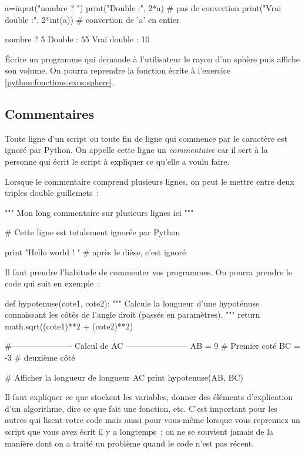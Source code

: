 {\begin{remarque}
\begin{pythonexemple}
a=input("nombre ? ")
print("Double :", 2*a)                # pas de convertion
print("Vrai double :", 2*int(a))      # convertion de 'a' en entier
\end{pythonexemple}

\begin{result}
nombre ? 5
Double : 55
Vrai double : 10
\end{result}
\end{remarque}

\begin{exercice}
Écrire un programme qui demande à l'utilisateur le rayon d'un sphère puis affiche son volume.
On pourra reprendre la fonction écrite à l'exercice \ref{python:fonctions:exos:sphere}.
\end{exercice}

\subsection{Commentaires}
Toute ligne d'un script ou toute fin de ligne qui commence par le caractère \motcle{\#} est ignoré
par Python. On appelle cette ligne un \textit{commentaire} car il sert à la personne qui écrit le
script à expliquer ce qu'elle a voulu faire.

 Lorsque le commentaire comprend plusieurs lignes, on peut le mettre entre deux triples double guillemets~:

\begin{pythoncode}
"""
Mon long commentaire sur
plusieurs lignes ici
"""

# Cette ligne est totalement ignorée par Python

print "Hello world ! " # après le dièse, c'est ignoré
\end{pythoncode}
\newpage{}

Il faut prendre l'habitude de commenter vos programmes. On pourra prendre le code qui suit en exemple~:
\begin{pythoncode}
def hypotenuse(cote1, cote2):
    """
    Calcule la longueur d'une hypoténuse connaissant
    les côtés de l'angle droit (passés en paramètres).
    """
    return math.sqrt((cote1)**2 + (cote2)**2)

#---------------------- Calcul de AC -----------------------
AB = 9      # Premier coté
BC = -3     # deuxième côté

# Afficher la longueur de longueur AC
print hypotenuse(AB, BC)
\end{pythoncode}
Il faut expliquer ce que stockent les variables, donner des éléments d'explication d'un algorithme,
dire ce que fait une fonction, etc. C'est important pour les autres qui lisent votre code mais aussi
 pour vous-même lorsque vous reprennez un script que vous avez écrit il y a longtemps~: on ne se
 souvient jamais de la manière dont on a traité un problème quand le code n'est pas récent.



}
